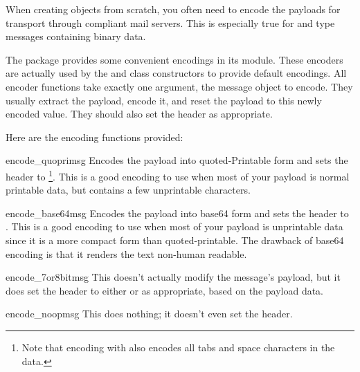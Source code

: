 
When creating  objects from scratch, you often need to
encode the payloads for transport through compliant mail servers.
This is especially true for  and 
type messages containing binary data.

The  package provides some convenient encodings in its
 module.  These encoders are actually used by the
 and  class constructors to provide default
encodings.  All encoder functions take exactly one argument, the
message object to encode.  They usually extract the payload, encode
it, and reset the payload to this newly encoded value.  They should also
set the  header as appropriate.

Here are the encoding functions provided:

\begin{funcdesc}{encode_quopri}{msg}
Encodes the payload into quoted-Printable form and sets the
 header to
\footnote{Note that encoding with
 also encodes all tabs and space characters in
the data.}.
This is a good encoding to use when most of your payload is normal
printable data, but contains a few unprintable characters.
\end{funcdesc}

\begin{funcdesc}{encode_base64}{msg}
Encodes the payload into base64 form and sets the
 header to
.  This is a good encoding to use when most of your payload
is unprintable data since it is a more compact form than
quoted-printable.  The drawback of base64 encoding is that it
renders the text non-human readable.
\end{funcdesc}

\begin{funcdesc}{encode_7or8bit}{msg}
This doesn't actually modify the message's payload, but it does set
the  header to either  or
 as appropriate, based on the payload data.
\end{funcdesc}

\begin{funcdesc}{encode_noop}{msg}
This does nothing; it doesn't even set the
 header.
\end{funcdesc}

